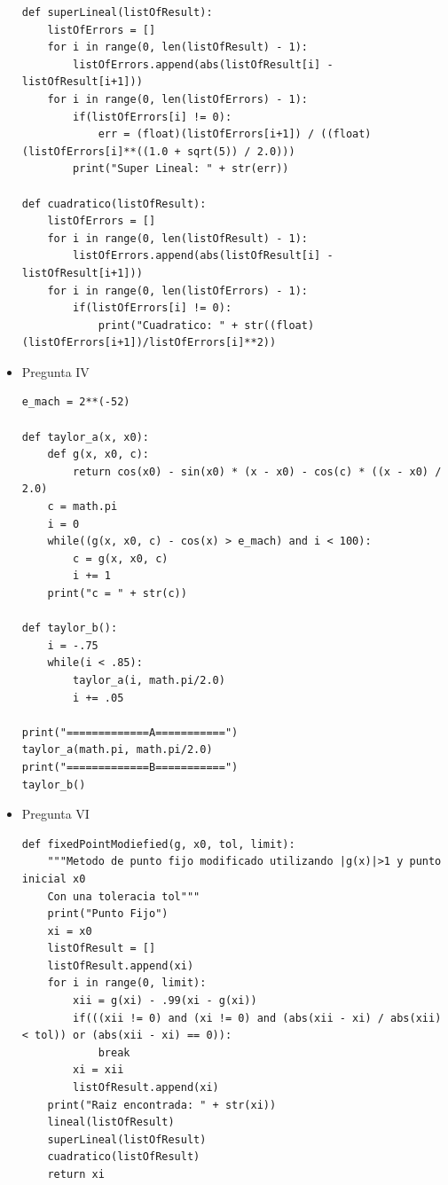 \documentclass{article}
\begin{document}
\begin{itemize}
\begin{verbatim}
def superLineal(listOfResult):
	listOfErrors = []
	for i in range(0, len(listOfResult) - 1):
		listOfErrors.append(abs(listOfResult[i] - listOfResult[i+1]))
	for i in range(0, len(listOfErrors) - 1):
		if(listOfErrors[i] != 0):
			err = (float)(listOfErrors[i+1]) / ((float)(listOfErrors[i]**((1.0 + sqrt(5)) / 2.0)))
		print("Super Lineal: " + str(err))

def cuadratico(listOfResult):
	listOfErrors = []
	for i in range(0, len(listOfResult) - 1):
		listOfErrors.append(abs(listOfResult[i] - listOfResult[i+1]))
	for i in range(0, len(listOfErrors) - 1):
		if(listOfErrors[i] != 0):
			print("Cuadratico: " + str((float)(listOfErrors[i+1])/listOfErrors[i]**2))
\end{verbatim}

\item Pregunta IV
\begin{verbatim}
e_mach = 2**(-52)

def taylor_a(x, x0):
	def g(x, x0, c):
		return cos(x0) - sin(x0) * (x - x0) - cos(c) * ((x - x0) / 2.0)
	c = math.pi
	i = 0
	while((g(x, x0, c) - cos(x) > e_mach) and i < 100):
		c = g(x, x0, c)
		i += 1
	print("c = " + str(c))

def taylor_b():
	i = -.75
	while(i < .85):
		taylor_a(i, math.pi/2.0)
		i += .05

print("=============A===========")
taylor_a(math.pi, math.pi/2.0)
print("=============B===========")
taylor_b()
\end{verbatim}

\item Pregunta VI
\begin{verbatim}
def fixedPointModiefied(g, x0, tol, limit):
	"""Metodo de punto fijo modificado utilizando |g(x)|>1 y punto inicial x0
	Con una toleracia tol"""
	print("Punto Fijo")
	xi = x0
	listOfResult = []
	listOfResult.append(xi)
	for i in range(0, limit):
		xii = g(xi) - .99(xi - g(xi))
		if(((xii != 0) and (xi != 0) and (abs(xii - xi) / abs(xii) < tol)) or (abs(xii - xi) == 0)):
			break
		xi = xii
		listOfResult.append(xi)
	print("Raiz encontrada: " + str(xi))
	lineal(listOfResult)
	superLineal(listOfResult)
	cuadratico(listOfResult)
	return xi
\end{verbatim}

\end{itemize}
\end{document}
